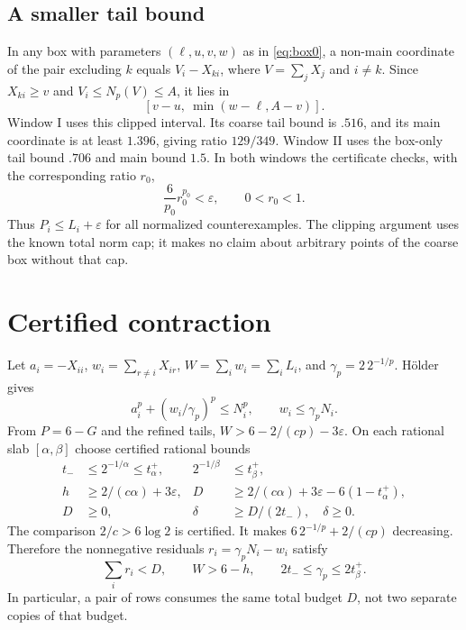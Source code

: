 \documentclass[11pt,a4paper]{article}
\theoremstyle{remark}\newtheorem{remark}[theorem]{Remark}
\newcommand{\Np}{N_p}\newcommand{\F}{F_{p,K}}
\begin{document}
\subsection{A smaller tail bound}
In any box with parameters $(\ell,u,v,w)$ as in \eqref{eq:box0}, a
non-main coordinate of the pair excluding $k$ equals $V_i-X_{ki}$,
where $V=\sum_jX_j$ and $i\ne k$. Since $X_{ki}\ge v$ and
$V_i\le\Np(V)\le A$, it lies in
\begin{equation}\label{eq:clip}
[v-u,\ \min(w-\ell,A-v)].
\end{equation}
Window I uses this clipped interval. Its coarse tail bound is $.516$,
and its main coordinate is at least $1.396$, giving ratio $129/349$.
Window II uses the box-only tail bound $.706$ and main bound $1.5$.
In both windows the certificate checks, with the corresponding ratio $r_0$,
\begin{equation}\label{eq:tail}
\frac6{p_0}r_0^{p_0}<\varepsilon,\qquad 0<r_0<1.
\end{equation}
Thus $P_i\le L_i+\varepsilon$ for all normalized counterexamples.
The clipping argument uses the known total norm cap; it makes no claim
about arbitrary points of the coarse box without that cap.

\section{Certified contraction}\label{sec:contract}
Let $a_i=-X_{ii}$, $w_i=\sum_{r\ne i}X_{ir}$, $W=\sum_iw_i=\sum_iL_i$,
and $\gamma_p=2\,2^{-1/p}$. H\"older gives
\begin{equation}\label{eq:row}
a_i^p+(w_i/\gamma_p)^p\le N_i^p,\qquad w_i\le\gamma_pN_i.
\end{equation}
From $P=6-G$ and the refined tails,
$W>6-2/(cp)-3\varepsilon$.
On each rational slab $[\alpha,\beta]$ choose certified rational bounds
\begin{align}
t_-&\le2^{-1/\alpha}\le t_\alpha^+,&2^{-1/\beta}&\le t_\beta^+,\nonumber\\
h&\ge2/(c\alpha)+3\varepsilon,&
D&\ge2/(c\alpha)+3\varepsilon-6(1-t_\alpha^+),\label{eq:budgets}\\
D&\ge0,&\delta&\ge D/(2t_-),\quad\delta\ge0.\nonumber
\end{align}
The comparison $2/c>6\log2$ is certified. It makes
$6\,2^{-1/p}+2/(cp)$ decreasing. Therefore the nonnegative residuals
$r_i=\gamma_pN_i-w_i$ satisfy
\begin{equation}\label{eq:residual}
\sum_i r_i<D,\qquad W>6-h,\qquad 2t_-\le\gamma_p\le2t_\beta^+.
\end{equation}
In particular, a pair of rows consumes the same total budget $D$,
not two separate copies of that budget.
\end{document}

